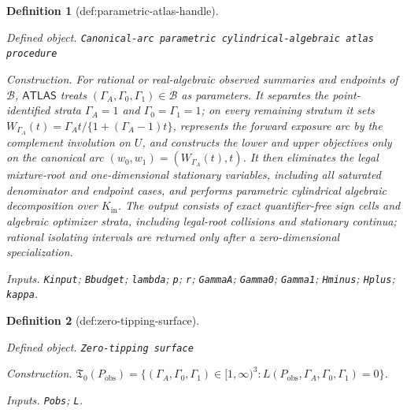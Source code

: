\documentclass{article}
\newtheorem{definition}{Definition}
\begin{document}
\begin{definition}[def:parametric-atlas-handle]\label{def:parametric-atlas-handle}
\par\smallskip\noindent\emph{Defined object.} \texttt{Canonical-\allowbreak{}arc parametric cylindrical-\allowbreak{}algebraic atlas procedure}
\par\smallskip\noindent\emph{Construction.} For rational or real-algebraic observed summaries and endpoints of \(\mathcal B\), \(\mathsf{ATLAS}\) treats \((\Gamma_A,\Gamma_0,\Gamma_1)\in\mathcal B\) as parameters.  It separates the point-identified strata \(\Gamma_A=1\) and \(\Gamma_0=\Gamma_1=1\); on every remaining stratum it sets \(W_{\Gamma_A}(t)=\Gamma_A t/\{1+(\Gamma_A-1)t\}\), represents the forward exposure arc by the complement involution on \(U\), and constructs the lower and upper objectives only on the canonical arc \((w_0,w_1)=(W_{\Gamma_A}(t),t)\).  It then eliminates the legal mixture-root and one-dimensional stationary variables, including all saturated denominator and endpoint cases, and performs parametric cylindrical algebraic decomposition over \(K_{\mathrm{in}}\).  The output consists of exact quantifier-free sign cells and algebraic optimizer strata, including legal-root collisions and stationary continua; rational isolating intervals are returned only after a zero-dimensional specialization.
\par\smallskip\noindent\emph{Inputs.} \texttt{Kinput}; \texttt{Bbudget}; \texttt{lambda}; \texttt{p}; \texttt{r}; \texttt{GammaA}; \texttt{Gamma0}; \texttt{Gamma1}; \texttt{Hminus}; \texttt{Hplus}; \texttt{kappa}.
\end{definition}

\begin{definition}[def:zero-tipping-surface]\label{def:zero-tipping-surface}
\par\smallskip\noindent\emph{Defined object.} \texttt{Zero-\allowbreak{}tipping surface}
\par\smallskip\noindent\emph{Construction.} \(\mathfrak T_0(P_{\mathrm{obs}})=\{(\Gamma_A,\Gamma_0,\Gamma_1)\in[1,\infty)^3:L(P_{\mathrm{obs}},\Gamma_A,\Gamma_0,\Gamma_1)=0\}\).
\par\smallskip\noindent\emph{Inputs.} \texttt{Pobs}; \texttt{L}.
\end{definition}
\end{document}
